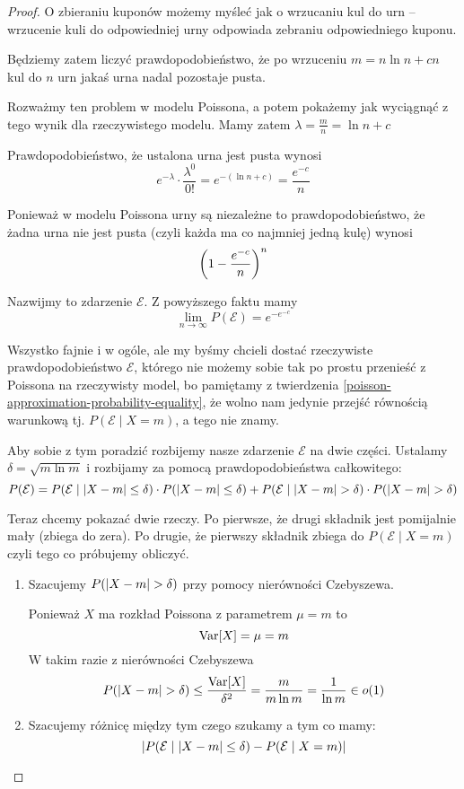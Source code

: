 \begin{proof}
	O zbieraniu kuponów możemy myśleć jak o wrzucaniu kul do urn -- wrzucenie kuli do odpowiedniej urny odpowiada zebraniu odpowiedniego kuponu.

	Będziemy zatem liczyć prawdopodobieństwo, że po wrzuceniu \( m = n \ln n + cn \) kul do \( n \) urn jakaś urna nadal pozostaje pusta.

	Rozważmy ten problem w modelu Poissona, a potem pokażemy jak wyciągnąć z tego wynik dla rzeczywistego modelu.
	Mamy zatem \( \lambda = \frac{m}{n} = \ln n + c \)

	Prawdopodobieństwo, że ustalona urna jest pusta wynosi
	\[
		e^{-\lambda} \cdot \frac{\lambda^0}{0!} = e^{-(\ln n + c)} = \frac{e^{-c}}{n}
	\]

	Ponieważ w modelu Poissona urny są niezależne to prawdopodobieństwo, że żadna urna nie jest pusta (czyli każda ma co najmniej jedną kulę) wynosi
	\[
		\left(1 - \frac{e^{-c}}{n}\right)^n
	\]

	Nazwijmy to zdarzenie \( \mathcal{E} \). Z powyższego faktu mamy
	\[
		\lim_{n \rightarrow \infty} P(\mathcal{E}) = e^{-e^{-c}}
	\]

	Wszystko fajnie i w ogóle, ale my byśmy chcieli dostać rzeczywiste prawdopodobieństwo \( \mathcal{E} \), którego nie możemy sobie tak po prostu przenieść z Poissona na rzeczywisty model, bo pamiętamy z twierdzenia \ref{poisson-approximation-probability-equality}, że wolno nam jedynie przejść równością warunkową tj.
	\( P( \mathcal{E} \mid X = m) \), a tego nie znamy.

	Aby sobie z tym poradzić rozbijemy nasze zdarzenie \( \mathcal{E} \) na dwie części.
	Ustalamy \( \delta = \sqrt{m \ln m} \) i rozbijamy za pomocą prawdopodobieństwa całkowitego:
	\[
		P(\mathcal{E}) =
		P(\mathcal{E} \mid \left\lvert X - m\right\rvert \leq \delta) \cdot P(\left\lvert X - m\right\rvert \leq \delta)
		+
		P(\mathcal{E} \mid \left\lvert X - m\right\rvert > \delta) \cdot P(\left\lvert X - m\right\rvert > \delta)
	\]

	Teraz chcemy pokazać dwie rzeczy. Po pierwsze, że drugi składnik jest pomijalnie mały (zbiega do zera).
	Po drugie, że pierwszy składnik zbiega do \( P(\mathcal{E} \mid X = m) \) czyli tego co próbujemy obliczyć.

	\begin{enumerate}
		\item Szacujemy \( P(\left\lvert X - m\right\rvert > \delta) \) przy pomocy nierówności Czebyszewa.

		      Ponieważ \( X \) ma rozkład Poissona z parametrem \( \mu = m \) to
		      \[ \variance{X} = \mu = m \]
		      W takim razie z nierówności Czebyszewa
		      \[
			      P(\abs{X - m} > \delta) \leq \frac{\variance{X}}{\delta^2} = \frac{m}{m \ln m} = \frac{1}{\ln m} \in o(1)
		      \]
		\item Szacujemy różnicę między tym czego szukamy a tym co mamy:
		      \[ \left\lvert P(\mathcal{E} \mid \left\lvert X - m\right\rvert \leq \delta) - P(\mathcal{E} \mid X = m)\right\rvert \]


\end{enumerate}
\end{proof}
